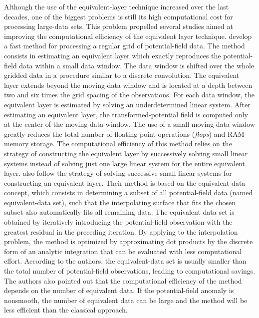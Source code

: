 Although the use of the equivalent-layer technique increased over the last decades, one of the biggest 
problems is still its high computational cost for processing large-data sets. 
This problem propelled several studies aimed at improving the computational efficiency of the 
equivalent layer technique. 
\citet{leao-silva1989} develop a fast method for processing a regular grid of potential-field data.
The method consists in estimating an equivalent layer which exactly reproduces the potential-field data 
within a small data window. The data window is shifted over the whole gridded data in a procedure similar 
to a discrete convolution. 
The equivalent layer extends beyond the moving-data window and is located at a depth between two and six 
times the grid spacing of the observations. For each data window, the equivalent layer is estimated by 
solving an underdetermined linear system.
After estimating an equivalent layer, the transformed-potential field is computed only at the center of the 
moving-data window. The use of a small moving-data window greatly reduces the total number of floating-point 
operations (\textit{flops}) and RAM memory storage. The computational efficiency of this method relies on the 
strategy of constructing the equivalent layer by successively solving small linear systems instead of solving 
just one large linear system for the entire equivalent layer. 
\citet{mendonca-silva1994} also follow the strategy of solving successive small linear systems for 
constructing an equivalent layer. Their method is based on the  equivalent-data concept, which 
consists in determining a subset of all potential-field data (named equivalent-data set), such that the 
interpolating surface that fits the chosen subset also automatically fits all remaining data. 
The equivalent data set is obtained by iteratively introducing the potential-field observation with the 
greatest residual in the preceding iteration. By applying to the interpolation problem, the method is 
optimized by approximating dot products by the discrete form of an analytic integration that can be 
evaluated with less computational effort. According to the authors, the equivalent-data set is usually 
smaller than the total number of potential-field observations, leading to computational savings. 
The authors also pointed out that the computational efficiency of the method depends on the number of 
equivalent data. If the potential-field anomaly is nonsmooth, the number of equivalent data can be large and 
the method will be less efficient than the classical approach.

